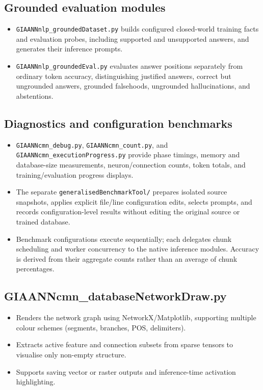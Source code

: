 \subsection{Grounded evaluation modules}
\begin{itemize}
	\item \texttt{GIAANNnlp\_groundedDataset.py} builds configured closed-world training facts and evaluation probes, including supported and unsupported answers, and generates their inference prompts.
	\item \texttt{GIAANNnlp\_groundedEval.py} evaluates answer positions separately from ordinary token accuracy, distinguishing justified answers, correct but ungrounded answers, grounded falsehoods, ungrounded hallucinations, and abstentions.
\end{itemize}

\subsection{Diagnostics and configuration benchmarks}
\begin{itemize}
	\item \texttt{GIAANNcmn\_debug.py}, \texttt{GIAANNcmn\_count.py}, and \texttt{GIAANNcmn\_executionProgress.py} provide phase timings, memory and database-size measurements, neuron/connection counts, token totals, and training/evaluation progress displays.
	\item The separate \texttt{generalisedBenchmarkTool/} prepares isolated source snapshots, applies explicit file/line configuration edits, selects prompts, and records configuration-level results without editing the original source or trained database.
	\item Benchmark configurations execute sequentially; each delegates chunk scheduling and worker concurrency to the native inference modules. Accuracy is derived from their aggregate counts rather than an average of chunk percentages.
\end{itemize}

\subsection{GIAANNcmn\_databaseNetworkDraw.py}
\begin{itemize}
	\item Renders the network graph using NetworkX/Matplotlib, supporting multiple colour schemes (segments, branches, POS, delimiters).
	\item Extracts active feature and connection subsets from sparse tensors to visualise only non-empty structure.
	\item Supports saving vector or raster outputs and inference-time activation highlighting.
\end{itemize}

